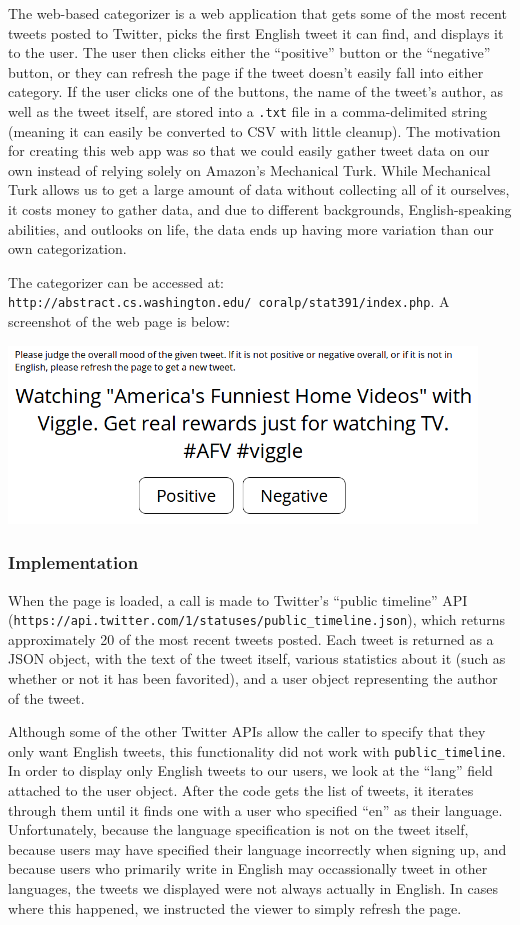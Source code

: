 \documentclass[12pt,a4paper]{article}
\begin{document}
The web-based categorizer is a web application that gets some of the most recent tweets posted to Twitter, picks the first English tweet it can find, and displays it to the user. The user then clicks either the ``positive'' button or the ``negative'' button, or they can refresh the page if the tweet doesn’t easily fall into either category. If the user clicks one of the buttons, the name of the tweet’s author, as well as the tweet itself, are stored into a \texttt{.txt} file in a comma-delimited string (meaning it can easily be converted to CSV with little cleanup). The motivation for creating this web app was so that we could easily gather tweet data on our own instead of relying solely on Amazon’s Mechanical Turk. While Mechanical Turk allows us to get a large amount of data without collecting all of it ourselves, it costs money to gather data, and due to different backgrounds, English-speaking abilities, and outlooks on life, the data ends up having more variation than our own categorization.

The categorizer can be accessed at: \texttt{http://abstract.cs.washington.edu/~coralp/stat391/index.php}. A screenshot of the web page is below:

\includegraphics[width=470px]{figs/web_cat.png}

\subsubsection{Implementation}

When the page is loaded, a call is made to Twitter’s ``public timeline'' API \\
(\texttt{https://api.twitter.com/1/statuses/public\_timeline.json}), which returns approximately 20 of the most recent tweets posted. Each tweet is returned as a JSON object, with the text of the tweet itself, various statistics about it (such as whether or not it has been favorited), and a user object representing the author of the tweet.

Although some of the other Twitter APIs allow the caller to specify that they only want English tweets, this functionality did not work with \texttt{public\_timeline}. In order to display only English tweets to our users, we look at the ``lang'' field attached to the user object. After the code gets the list of tweets, it iterates through them until it finds one with a user who specified ``en'' as their language. Unfortunately, because the language specification is not on the tweet itself, because users may have specified their language incorrectly when signing up, and because users who primarily write in English may occassionally tweet in other languages, the tweets we displayed were not always actually in English. In cases where this happened, we instructed the viewer to simply refresh the page.
\end{document}
